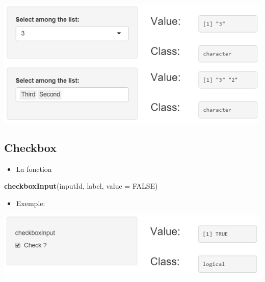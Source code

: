 \documentclass[]{article}
\newenvironment{Shaded}{\begin{snugshade}}{\end{snugshade}}
\newcommand{\KeywordTok}[1]{\textcolor[rgb]{0.13,0.29,0.53}{\textbf{#1}}}
\newcommand{\DataTypeTok}[1]{\textcolor[rgb]{0.13,0.29,0.53}{#1}}
\newcommand{\StringTok}[1]{\textcolor[rgb]{0.31,0.60,0.02}{#1}}
\newcommand{\CommentTok}[1]{\textcolor[rgb]{0.56,0.35,0.01}{\textit{#1}}}
\newcommand{\OtherTok}[1]{\textcolor[rgb]{0.56,0.35,0.01}{#1}}
\newcommand{\NormalTok}[1]{#1}
\providecommand{\tightlist}{%
  \setlength{\itemsep}{0pt}\setlength{\parskip}{0pt}}
\begin{document}
\includegraphics{img/unique_select.png}

\subsection{Checkbox}\label{checkbox}

\begin{itemize}
\tightlist
\item
  La fonction
\end{itemize}

\begin{Shaded}
\begin{Highlighting}[]
\KeywordTok{checkboxInput}\NormalTok{(inputId, label, }\DataTypeTok{value =} \OtherTok{FALSE}\NormalTok{)}
\end{Highlighting}
\end{Shaded}

\begin{itemize}
\tightlist
\item
  Exemple:
\end{itemize}

\begin{Shaded}
\end{Shaded}

\includegraphics{img/logical.png}
\end{document}

